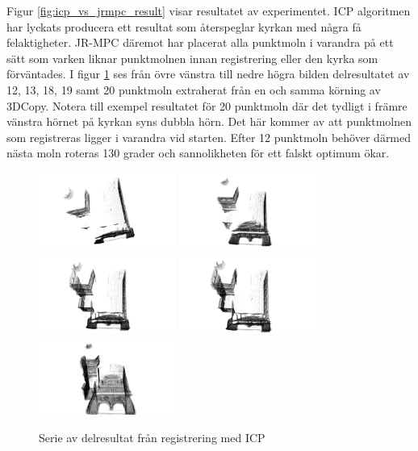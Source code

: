 Figur \ref{fig:icp_vs_jrmpc_result} visar resultatet av experimentet. ICP algoritmen har lyckats producera ett resultat som återspeglar kyrkan med några få felaktigheter. JR-MPC däremot har placerat alla punktmoln i varandra på ett sätt som varken liknar punktmolnen innan registrering eller den kyrka som förväntades. I figur \ref{fig:registered_church_serie} ses från övre vänstra till nedre högra bilden delresultatet av 12, 13, 18, 19 samt 20 punktmoln extraherat från en och samma körning av 3DCopy. Notera till exempel resultatet för 20 punktmoln där det tydligt i främre vänstra hörnet på kyrkan syns dubbla hörn. Det här kommer av att punktmolnen som registreras ligger i varandra vid starten. Efter 12 punktmoln behöver därmed nästa moln roteras 130 grader och sannolikheten för ett falskt optimum ökar.
\begin{figure}[H]
	\centering
	\includegraphics[width=45mm]{figures/12_pc.png}
	\includegraphics[width=45mm]{figures/13_pc.png}
	\includegraphics[width=45mm]{figures/18_pc.png}
	\includegraphics[width=45mm]{figures/19_pc.png}
	\includegraphics[width=45mm]{figures/20_pc.png}
	\caption{Serie av delresultat från registrering med ICP}
	\label{fig:registered_church_serie}
\end{figure}

